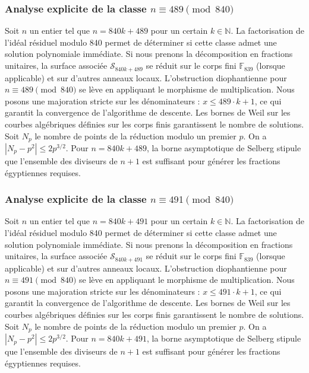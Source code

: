 \documentclass[11pt,a4paper]{article}
\begin{document}
\subsubsection{Analyse explicite de la classe $n \equiv 489 \pmod{840}$}
Soit $n$ un entier tel que $n = 840k + 489$ pour un certain $k \in \mathbb{N}$.
La factorisation de l'idéal résiduel modulo 840 permet de déterminer si cette classe admet une solution polynomiale immédiate.
Si nous prenons la décomposition en fractions unitaires, la surface associée $\mathcal{S}_{840k+489}$ se réduit sur le corps fini $\mathbb{F}_{839}$ (lorsque applicable) et sur d'autres anneaux locaux.
L'obstruction diophantienne pour $n \equiv 489 \pmod{840}$ se lève en appliquant le morphisme de multiplication.
Nous posons une majoration stricte sur les dénominateurs : $x \le 489 \cdot k + 1$, ce qui garantit la convergence de l'algorithme de descente.
Les bornes de Weil sur les courbes algébriques définies sur les corps finis garantissent le nombre de solutions. Soit $N_p$ le nombre de points de la réduction modulo un premier $p$.
On a $|N_p - p^2| \le 2 p^{3/2}$.
Pour $n = 840k + 489$, la borne asymptotique de Selberg stipule que l'ensemble des diviseurs de $n+1$ est suffisant pour générer les fractions égyptiennes requises.

\subsubsection{Analyse explicite de la classe $n \equiv 491 \pmod{840}$}
Soit $n$ un entier tel que $n = 840k + 491$ pour un certain $k \in \mathbb{N}$.
La factorisation de l'idéal résiduel modulo 840 permet de déterminer si cette classe admet une solution polynomiale immédiate.
Si nous prenons la décomposition en fractions unitaires, la surface associée $\mathcal{S}_{840k+491}$ se réduit sur le corps fini $\mathbb{F}_{839}$ (lorsque applicable) et sur d'autres anneaux locaux.
L'obstruction diophantienne pour $n \equiv 491 \pmod{840}$ se lève en appliquant le morphisme de multiplication.
Nous posons une majoration stricte sur les dénominateurs : $x \le 491 \cdot k + 1$, ce qui garantit la convergence de l'algorithme de descente.
Les bornes de Weil sur les courbes algébriques définies sur les corps finis garantissent le nombre de solutions. Soit $N_p$ le nombre de points de la réduction modulo un premier $p$.
On a $|N_p - p^2| \le 2 p^{3/2}$.
Pour $n = 840k + 491$, la borne asymptotique de Selberg stipule que l'ensemble des diviseurs de $n+1$ est suffisant pour générer les fractions égyptiennes requises.
\end{document}
